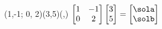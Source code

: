 \MATRIXVECTORPRODUCT(1,-1;
                     0, 2)(3,5)(\sola,\solb)
$\begin{bmatrix}
     1 & -1 \\ 0 & 2
 \end{bmatrix}
 \begin{bmatrix}
      3 \\ 5
 \end{bmatrix}
  =\begin{bmatrix}
         \sola \\ \solb
   \end{bmatrix}$
